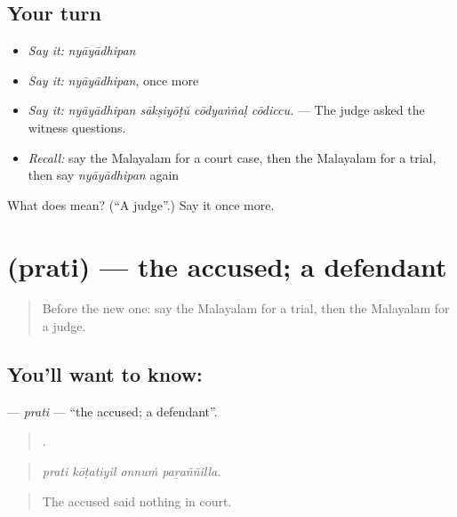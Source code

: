 \subsection*{Your turn}
\begin{itemize}
\raggedright
  \item \emph{Say it:} \emph{nyāyādhipan}
  \item \emph{Say it:} \emph{nyāyādhipan}, once more
  \item \emph{Say it:} \emph{nyāyādhipan sākṣiyōṭŭ cōdyaṅṅaḷ cōdiccu.} — The judge asked the witness questions.
  \item \emph{Recall:} say the Malayalam for a court case, then the Malayalam for a trial, then say \emph{nyāyādhipan} again
\end{itemize}

\begin{tcolorbox}[breakable,colback=teal!4,colframe=teal!35!black,title={Before you move on}]
What does  mean? (\textquotedblleft{}A judge\textquotedblright{}.) Say it once more.
\end{tcolorbox}
\section[\texorpdfstring{\ml{പ്രതി} (prati)}{പ്രതി (prati)}]{ (prati) — the accused; a defendant}

\label{lesson:ML-C368-prati}



\begin{quote}
Before the new one: say the Malayalam for a trial, then the Malayalam for a judge.
\end{quote}

\subsection*{You'll want to know: }
\textbf{} — \emph{prati} — \textquotedblleft{}the accused; a defendant\textquotedblright{}.

\begin{quote}
   .
\end{quote}

\begin{quote}
\emph{prati kōṭatiyil onnuṁ paṟaññilla.}
\end{quote}

\begin{quote}
The accused said nothing in court.
\end{quote}

